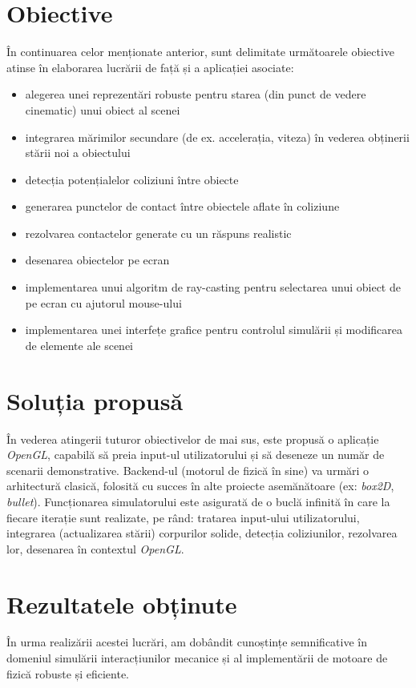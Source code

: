 \documentclass[12pt,a4paper]{report}
\begin{document}
\section{Obiective}
În continuarea celor menționate anterior, sunt delimitate următoarele obiective atinse în elaborarea lucrării de față și a aplicației asociate:
\begin{itemize}
	\item alegerea unei reprezentări robuste pentru starea (din punct de vedere cinematic) unui obiect al scenei
	\item integrarea mărimilor secundare (de ex. accelerația, viteza) în vederea obținerii stării noi a obiectului
	\item detecția potențialelor coliziuni între obiecte
	\item generarea punctelor de contact între obiectele aflate în coliziune
	\item rezolvarea contactelor generate cu un răspuns realistic
	\item desenarea obiectelor pe ecran
	\item implementarea unui algoritm de ray-casting pentru selectarea unui obiect de pe ecran cu ajutorul mouse-ului
	\item implementarea unei interfețe grafice pentru controlul simulării și modificarea de elemente ale scenei
\end{itemize}
\section{Soluția propusă} 
În vederea atingerii tuturor obiectivelor de mai sus, este propusă o aplicație \textit{OpenGL}, capabilă să preia input-ul utilizatorului și să deseneze un număr de scenarii demonstrative.
Backend-ul (motorul de fizică în sine) va urmări o arhitectură clasică, folosită cu succes în alte proiecte asemănătoare (ex: \textit{box2D}\cite{box2D}, \textit{bullet}\cite{bullet}). Funcționarea simulatorului este asigurată de o buclă infinită în care la fiecare iterație sunt realizate, pe rând: tratarea input-ului utilizatorului, integrarea (actualizarea stării) corpurilor solide,
detecția coliziunilor, rezolvarea lor, desenarea în contextul \textit{OpenGL}.
\section{Rezultatele obținute}
În urma realizării acestei lucrări, am dobândit cunoștințe semnificative în domeniul simulării interacțiunilor mecanice și al implementării de motoare de fizică robuste și eficiente.
\end{document}
